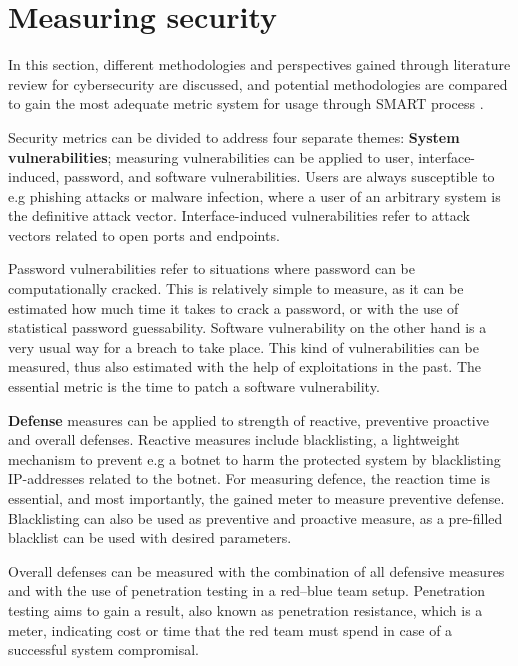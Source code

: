 \section{Measuring security} \label{measuringsecurity}

In this section, different methodologies and perspectives gained
through literature review for cybersecurity are discussed, and
potential methodologies are compared to gain the most adequate metric
system for usage through SMART process \cite{payne2006guide}.

Security metrics can be divided to address four separate themes:
\textbf{System vulnerabilities}; measuring vulnerabilities can be
applied to user, interface-induced, password, and software
vulnerabilities. Users are always susceptible to e.g phishing attacks
or malware infection, where a user of an arbitrary system is the
definitive attack vector. Interface-induced vulnerabilities refer to
attack vectors related to open ports and
endpoints. \cite{pendleton2016survey}

Password vulnerabilities refer to situations where password can be
computationally cracked. This is relatively simple to measure, as it
can be estimated how much time it takes to crack a password, or with
the use of statistical password guessability. Software vulnerability
on the other hand is a very usual way for a breach to take
place. This kind of vulnerabilities can be measured, thus also
estimated with the help of exploitations in the past. The
essential metric is the time to patch a software vulnerability. \cite{pendleton2016survey}

\textbf{Defense} measures can be applied to strength of reactive,
preventive proactive and overall defenses. Reactive measures include
blacklisting, a lightweight mechanism to prevent e.g a botnet to harm
the protected system by blacklisting IP-addresses related to the
botnet. For measuring defence, the reaction time is essential, and
most importantly, the gained meter to measure preventive
defense. Blacklisting can also be used as preventive and proactive
measure, as a pre-filled blacklist can be used with desired
parameters. \cite{pendleton2016survey, ramos2017model}

Overall defenses can be measured with the combination of all defensive
measures and with the use of penetration testing in a red–blue team
setup. Penetration testing aims to gain a result, also known as
penetration resistance, which is a meter, indicating cost or time that
the red team must spend in case of a successful system
compromisal. \cite{pendleton2016survey, ramos2017model}

